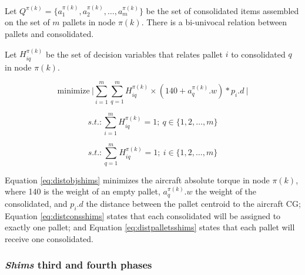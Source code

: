 \documentclass[preprint,authoryear]{elsarticle}
\begin{document}
Let $Q^{\pi(k)}  = \{ a^{\pi(k)}_1, a^{\pi(k)}_2, \ldots, a^{\pi(k)}_m \}$ be the set of consolidated items assembled on the set of $m$ pallets in node $\pi(k)$. There is a bi-univocal relation between pallets and consolidated.

Let $H^{\pi(k)}_{iq}$ be the set of decision variables that relates pallet $i$ to consolidated $q$ in node $\pi(k)$.

\begin{equation} \label{eq:distobjshims}
	\mbox{minimize}\ \Bigg |  \sum_{i=1}^{m} \sum_{q=1}^{m} H^{\pi(k)}_{iq} \times  (140 + a^{\pi(k)}_q.w) * p_i.d\ \Bigg | 
\end{equation}

\begin{equation} \label{eq:distconsshims}
	s.t.: \sum_{i=1}^{m} H^{\pi(k)}_{iq} = 1;\ q \in \{1,2,\ldots,m\}
\end{equation}

\begin{equation} \label{eq:distpalletsshims}
	s.t.: \sum_{q=1}^{m} H^{\pi(k)}_{iq}=1;\ i \in \{1,2,\ldots,m\}
\end{equation}

Equation \ref{eq:distobjshims} minimizes the aircraft absolute torque in node $\pi(k)$, where 140 is the weight of an empty pallet, $a^{\pi(k)}_q.w$ the weight of the consolidated, and $p_i.d$ the distance between the pallet centroid to the aircraft CG; Equation \ref{eq:distconsshims} states that each consolidated will be assigned to exactly one pallet; and Equation \ref{eq:distpalletsshims} states that each pallet will receive one consolidated.


\subsubsection{{\it Shims} third and fourth phases}
\end{document}
